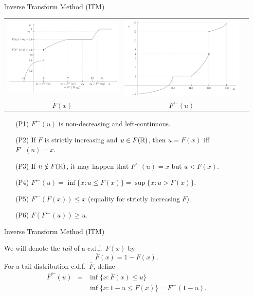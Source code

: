 \documentclass[aspectratio=169]{beamer}
\begin{document}
\begin{frame}{Inverse Transform Method (ITM)}

  \begin{tabular}{ccc}
 \includegraphics[width=0.5\linewidth]{pics/figure_inverse_fun1.png}
&
\includegraphics[width=0.45\linewidth]{pics/figure_inverse_fun2.png} \\
$F(x)$ & $F^{\leftarrow}(u)$
 \end{tabular}
 \begin{itemize}
 \item[(P1)] \(F^{\leftarrow}(u)\) is non-decreasing and left-continuous.
 \item[(P2)] If \(F\) is strictly increasing and \(u\in F(\mathbb{R})\), then
       \(u=F(x)\) iff \(F^{\leftarrow}(u)=x\).
 \item[(P3)] If \(u\notin F(\mathbb{R})\), it may happen that \(F^{\leftarrow}(u)=x\) but \(u<F(x)\).
 \item[(P4)] \(F^{\leftarrow}(u)=\inf\{x:u\le F(x)\}=\sup\{x:u>F(x)\}\).
 \item[(P5)] \(F^{\leftarrow}(F(x))\le x\) (equality for strictly increasing \(F\)).
 \item[(P6)] \(F(F^{\leftarrow}(u))\ge u\).
\end{itemize}
\end{frame}




\begin{frame}{Inverse Transform Method (ITM)}

  We will denote the {\it tail} of a c.d.f.\ $F(x)$ by
$$\overline{F}(x)=1-F(x).$$
For a tail distribution c.d.f.\ $\overline{F}$, define
\begin{eqnarray*}
  \overline{F}^{\leftarrow}(u)&=&\inf\{x: \overline{F}(x)\le u\}\\
  &=&\inf\{x: 1-u\le F(x)\}={F}^{\leftarrow}(1-u).
\end{eqnarray*}

\end{frame}
\end{document}
